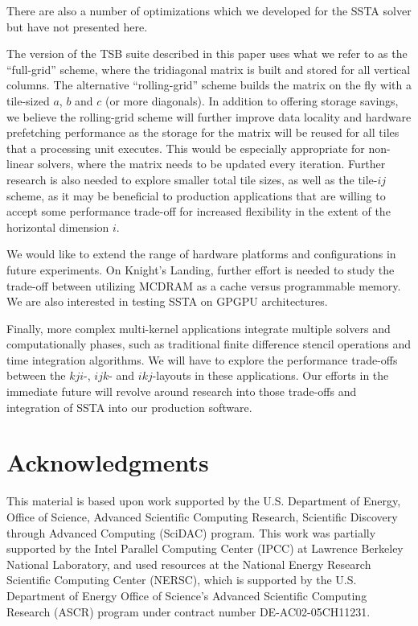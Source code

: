 \documentclass[10pt, conference, compsocconf]{IEEEtran}
\begin{document}
There are also a number of optimizations which we developed for the SSTA
  solver but have not presented here. 

The version of the TSB suite described in this paper uses what we refer to as
  the ``full-grid'' scheme, where the tridiagonal matrix is built and stored
  for all vertical columns.
The alternative ``rolling-grid'' scheme builds the matrix on the fly with
  a tile-sized \(a\), \(b\) and \(c\) (or more diagonals).
In addition to offering storage savings, we believe the rolling-grid scheme
  will further improve data locality and hardware prefetching performance as the
  storage for the matrix will be reused for all tiles that a processing
  unit executes.
This would be especially appropriate for non-linear solvers, where the 
  matrix needs to be updated every iteration.
Further research is also needed to explore smaller total tile sizes, as well as
  the tile-\(ij\) scheme, as it may be beneficial to production applications that
  are willing to accept some performance trade-off for increased flexibility in
  the extent of the horizontal dimension \(i\).


We would like to extend the range of hardware platforms and configurations in
  future experiments.
On Knight's Landing, further effort is needed to study the trade-off between
  utilizing MCDRAM as a cache versus programmable memory.
We are also interested in testing SSTA on GPGPU architectures.

Finally, more complex multi-kernel applications integrate multiple solvers and
  computationally phases, such as traditional finite difference
  stencil operations and time integration algorithms. 
We will have to explore the performance trade-offs between
  the \(kji\)-, \(ijk\)- and \(ikj\)-layouts in these applications.
Our efforts in the immediate future will revolve around research into those
  trade-offs and integration of SSTA into our production software.

\section*{Acknowledgments}
\label{sec:ack}
This material is based upon work supported by the U.S. Department of Energy,
  Office of Science, Advanced Scientific Computing Research, Scientific
  Discovery through Advanced Computing (SciDAC) program.
This work was partially supported by the Intel Parallel Computing Center (IPCC)
  at Lawrence Berkeley National Laboratory, and used resources at the National
  Energy Research Scientific Computing Center (NERSC), which is supported by
  the U.S. Department of Energy Office of Science's Advanced Scientific
  Computing Research (ASCR) program under contract number DE-AC02-05CH11231.  



\end{document}
